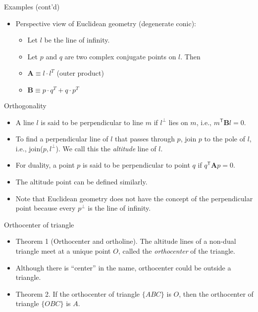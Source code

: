 \documentclass[10pt,ignorenonframetext,serif,onlymath]{beamer}
\providecommand{\tightlist}{%
  \setlength{\itemsep}{0pt}\setlength{\parskip}{0pt}}
\begin{document}
\begin{frame}{Examples (cont’d)}
\protect\hypertarget{sec:examples-contd}{}

\begin{itemize}
\tightlist
\item
  Perspective view of Euclidean geometry (degenerate conic):

  \begin{itemize}
  \tightlist
  \item
    Let \(l\) be the line of infinity.
  \item
    Let \(p\) and \(q\) are two complex conjugate points on \(l\). Then
  \item
    \(\mathbf{A} \equiv l \cdot l^{T}\) (outer product)
  \item
    \(\mathbf{B} \equiv p \cdot q^{T} + q \cdot p^{T}\)
  \end{itemize}
\end{itemize}

\end{frame}

\begin{frame}{Orthogonality}
\protect\hypertarget{sec:orthogonality}{}

\begin{itemize}
\item
  A line \(l\) is said to be perpendicular to line \(m\) if \(l^\perp\)
  lies on \(m\), i.e., \(m^\mathsf{T} \mathbf{B} l = 0\).
\item
  To find a perpendicular line of \(l\) that passes through \(p\), join
  \(p\) to the pole of \(l\), i.e., join(\(p, l^\perp\)). We call this
  the \emph{altitude} line of \(l\).
\item
  For duality, a point \(p\) is said to be perpendicular to point \(q\)
  if \(q^\mathsf{T} \mathbf{A} p = 0\).
\item
  The altitude point can be defined similarly.
\item
  Note that Euclidean geometry does not have the concept of the
  perpendicular point because every \(p^\perp\) is the line of infinity.
\end{itemize}

\end{frame}

\begin{frame}{Orthocenter of triangle}
\protect\hypertarget{sec:orthocenter-of-triangle}{}

\begin{itemize}
\item
  Theorem 1 (Orthocenter and ortholine). The altitude lines of a
  non-dual triangle meet at a unique point \(O\), called the
  \emph{orthocenter} of the triangle.
\item
  Although there is “center” in the name, orthocenter could be outside a
  triangle.
\item
  Theorem 2. If the orthocenter of triangle \(\{ABC\}\) is \(O\), then
  the orthocenter of triangle \(\{OBC\}\) is \(A\).
\end{itemize}

\end{frame}
\end{document}
